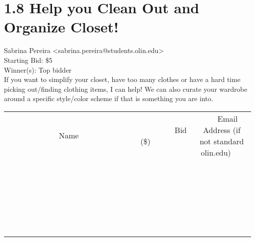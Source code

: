 \documentclass[11pt]{article}
\begin{document}
					\section*{1.8 Help you Clean Out and Organize Closet!}
					Sabrina Pereira <sabrina.pereira@students.olin.edu> \\
					Starting Bid: \$5 \\
					Winner(s): Top bidder \\
					If you want to simplify your closet, have too many clothes or have a hard time picking out/finding clothing items, I can help! We can also curate your wardrobe around a specific style/color scheme if that is something you are into. \\
					[6ex]
					\begin{tabular}{c c c}
						~~~~~~~~~~~~~Name~~~~~~~~~~~~~ & ~~~~~~~~~Bid (\$)~~~~~~~~~ & ~~~Email Address (if not standard olin.edu)~~~ \\
				
 & & \\
\hline
 & & \\
\hline
 & & \\
\hline
 & & \\
\hline
 & & \\
\hline
 & & \\
\hline
 & & \\
\hline
 & & \\
\hline
 & & \\
\hline
 & & \\
\hline
 & & \\
\hline
 & & \\
\hline
 & & \\
\hline
 & & \\
\hline
 & & \\
\hline
 & & \\
\hline
 & & \\
\hline
 & & \\
\hline
 & & \\
\hline
 & & \\
\hline
 & & \\
\hline
 & & \\
\hline
 & & \\
\hline
 & & \\
\hline
 & & \\
\hline
 & & \\
\hline
					\end{tabular}
					\clearpage
				
\end{document}
